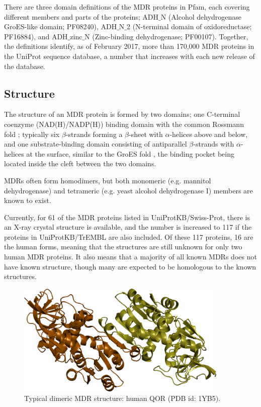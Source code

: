 \documentclass[a4paper, twoside, 12pt, openright]{report}
\begin{document}
There are three domain definitions of the MDR proteins in Pfam\cite{finn_pfam:_2014}, each covering different members and parts of the proteins; ADH$\_$N (Alcohol dehydrogenase GroES-like domain; PF08240), ADH$\_$N$\_$2 (N-terminal domain of oxidoreductase; PF16884), and ADH$\_$zinc$\_$N (Zinc-binding dehydrogenase; PF00107). Together, the definitions identify, as of February 2017, more than 170,000 MDR proteins in the UniProt sequence database, a number that increases with each new release of the database.


\subsection{Structure}

The structure of an MDR protein is formed by two domains; one C-terminal coenzyme (NAD(H)/NADP(H)) binding domain with the common Rossmann fold \cite{rao_comparison_1973}; typically six $\beta$-strands forming a $\beta$-sheet with $\alpha$-helices above and below, and one substrate-binding domain consisting of antiparallel $\beta$-strands with $\alpha$-helices at the surface, similar to the GroES fold \cite{taneja_conserved_1999}, the binding pocket being located inside the cleft between the two domains. 

MDRs often form homodimers, but both monomeric (e.g. mannitol dehydrogenase\cite{stoop_purification_1995}) and tetrameric (e.g. yeast alcohol dehydrogenase I\cite{raj_yeast_2014}) members are known to exist.

Currently, for 61 of the MDR proteins listed in UniProtKB/Swiss-Prot, there is an X-ray crystal structure is available, and the number is increased to 117 if the proteins in UniProtKB/TrEMBL are also included. Of these 117 proteins, 16 are the human forms, meaning that the structures are still unknown for only two human MDR proteins. It also means that a majority of all known MDRs does not have known structure, though many are expected to be homologous to the known structures. 
  
 \begin{figure}[htbp]
   \includegraphics[width=0.9\textwidth]{fig/mdr_structure.png}
  \caption{Typical dimeric MDR structure: human QOR (PDB id: 1YB5).}
  \label{fig:mdr_structure}
 \end{figure}
\end{document}
